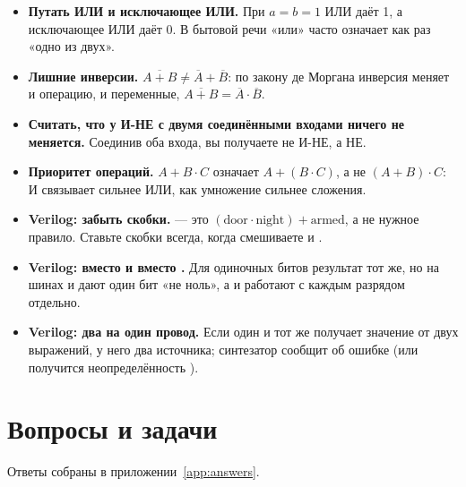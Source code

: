 \begin{warnbox}
\begin{itemize}
  \item \textbf{Путать ИЛИ и исключающее ИЛИ.} При $a=b=1$ ИЛИ даёт 1, а
    исключающее ИЛИ даёт 0. В бытовой речи «или» часто означает как раз
    «одно из двух».
  \item \textbf{Лишние инверсии.} $\overline{A+B}\neq\overline{A}+\overline{B}$:
    по закону де Моргана инверсия меняет и операцию, и переменные,
    $\overline{A+B}=\overline{A}\cdot\overline{B}$.
  \item \textbf{Считать, что у И-НЕ с двумя соединёнными входами ничего не
    меняется.} Соединив оба входа, вы получаете не И-НЕ, а НЕ.
  \item \textbf{Приоритет операций.} $A+B\cdot C$ означает $A+(B\cdot C)$, а не
    $(A+B)\cdot C$: И связывает сильнее ИЛИ, как умножение сильнее сложения.
  \item \textbf{Verilog: забыть скобки.}  --- это
    $(\text{door}\cdot\text{night})+\text{armed}$, а не нужное правило. Ставьте
    скобки всегда, когда смешиваете \code{\&} и \code{|}.
  \item \textbf{Verilog: \code{\&\&} вместо \code{\&} и \code{!} вместо
    \code{\textasciitilde}.} Для одиночных битов результат тот же, но на шинах
    \code{\&\&} и \code{!} дают один бит «не ноль», а \code{\&} и
    \code{\textasciitilde} работают с каждым разрядом отдельно.
  \item \textbf{Verilog: два  на один провод.} Если один и тот же
     получает значение от двух выражений, у него два источника;
    синтезатор сообщит об ошибке (или получится неопределённость ).
\end{itemize}
\end{warnbox}

\section{Вопросы и задачи}
\label{sec:tasks-gates}

Ответы собраны в приложении~\ref{app:answers}.

